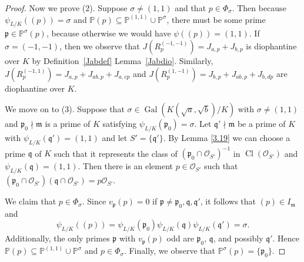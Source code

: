 \documentclass[12pt,reqno]{amsart}
\newcommand{\qq}{\mathfrak{q}}
\newcommand{\mm}{\mathfrak{m}}
\newcommand{\OO}{\mathcal{O}}
\newcommand{\pp}{\mathfrak{p}}
\newcommand{\PP}{\mathbb{P}}
\DeclareMathOperator{\Gal}{Gal}
\DeclareMathOperator{\Cl}{Cl}
\theoremstyle{definition}
\begin{document}
\begin{proof}
Now we prove (2). Suppose $\sigma\not=(1,1)$ and that $p\in \Phi_{\sigma}$. Then because
$\psi_{L/K}((p))=\sigma$ and $\PP(p)\subseteq \PP^{(1,1)}\cup
\PP^{\sigma}$, there must be some prime $\pp \in \PP^{\sigma}(p)$,
because otherwise we would have $\psi((p))=(1,1)$. If
$\sigma=(-1,-1)$, then we observe that
$J(R_p^{(-1,-1)})=J_{a,p}+J_{b,p}$ is diophantine over $K$ by Definition~\ref{Jabdef}
Lemma~\ref{Jabdio}. Similarly, 
$J(R_p^{(-1,1)}) = J_{a,p}+J_{ab,p}+J_{a,cp}$ and
$J(R_p^{(1,-1)})=J_{b,p}+J_{ab,p}+J_{b,dp}$ are diophantine over $K$.

We move on to (3). Suppose that
$\sigma\in \Gal(K(\sqrt{a},\sqrt{b})/K)$ with $\sigma\not=(1,1)$ and
$\pp_0\nmid \mm$ is a prime of $K$ satisfying
$\psi_{L/K}(\pp_0)=\sigma$. Let $\qq'\nmid \mm$ be a prime of $K$ with
$\psi_{L/K}(\qq')=(1,1)$ and let $S'=\{\qq'\}$. By Lemma \ref{3.19} we can
choose a prime $\qq$ of $K$ such that it represents the class of
$(\pp_0\cap \OO_{S'})^{-1}$ in $\Cl(\OO_{S'})$ and $\psi_{L/K}(\qq)=(1,1)$. Then there is
an element $p\in \OO_{S'}$ such that $(\pp_0\cap\OO_{S'})(\qq\cap\OO_{S'})=p\OO_{S'}$.

We claim that $p\in \Phi_{\sigma}$. Since $v_{\pp}(p)=0$ if $\pp\not=\pp_0,\qq,\qq'$, it follows that $(p)\in I_{\mm}$ and 
\[
\psi_{L/K}((p))=\psi_{L/K}(\pp_0)\psi_{L/K}(\qq)\psi_{L/K}(\qq')=\sigma.
\]
Additionally, the only primes $\pp$ with $v_{\pp}(p)$ odd are $\pp_0$, $\qq$, and possibly $\qq'$. Hence $\PP(p)\subseteq \PP^{(1,1)}\cup\PP^{\sigma}$ and $p\in \Phi_{\sigma}$. Finally, we observe that $\PP^{\sigma}(p)=\{\pp_0\}$. 

\end{proof}
\end{document}
